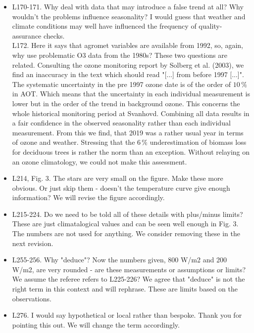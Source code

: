 \documentclass{scrartcl}
\begin{document}
\begin{itemize}
\item {\color{blue}L170-171. Why deal with data that may introduce a false trend at all? Why wouldn't the problems influence seasonality? I would guess that weather and climate conditions may well have influenced the frequency of quality-assurance checks.\\
L172. Here it says that agromet variables are available from 1992, so, again, why use problematic O3 data from the 1980s?}
These two questions are related. Consulting the ozone monitoring report by Solberg et al. (2003), we find an inaccuracy in the text which should read "[...] from before 1997 [...]". The systematic uncertainty in the pre 1997 ozone date is of the order of $10\,\%$ in AOT. Which means that the uncertainty in each individual measurement is lower but in the order of the trend in background ozone. This concerns the whole historical monitoring period at Svanhovd. Combining all data results in a fair confidence in the observed seasonality rather than each individual measurement. From this we find, that 2019 was a rather usual year in terms of ozone and weather. Stressing that the $6\,\%$ underestimation of biomass loss for deciduous trees is rather the norm than an exception. Without relaying on an ozone climatology, we could not make this assessment.

\item {\color{blue}L214, Fig. 3. The stars are very small on the figure. Make these more obvious. Or just skip them - doesn't the temperature curve give enough information?}
We will revise the figure accordingly.

\item {\color{blue}L215-224. Do we need to be told all of these details with plus/minus limits? These are just climatalogical values and can be seen well enough in Fig. 3. The numbers are not used for anything.}
We consider removing these in the next revision.

\item {\color{blue}L255-256. Why "deduce"? Now the numbers given, 800 W/m2 and 200 W/m2, are very rounded - are these measurements or assumptions or limits?}
We assume the referee refers to L225-226? We agree that "deduce" is not the right term in this context and will rephrase. These are limits based on the observations.

\item {\color{blue}L276. I would say hypothetical or local rather than bespoke.}
Thank you for pointing this out. We will change the term accordingly.


\end{itemize}
\end{document}
